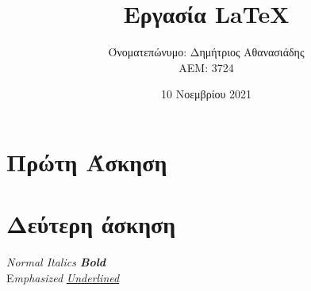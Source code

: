 \documentclass{article}
\title{Εργασία \textlatin {\LaTeX}} %
\author{Όνοματεπώνυμο: Δημήτριος Αθανασιάδης  \\  ΑΕΜ: 3724}       %
\date{10 Νοεμβρίου 2021}
\begin{document}
\maketitle

\section{Πρώτη Άσκηση}
\begin{center}
\end{center}

\section{Δεύτερη άσκηση}
\begin{center}
\textlatin{\textit{Normal Italics \textbf{Bold}}\\ E\emph{mphasized}  \textit{\underline{Underlined}}}
\end{center}
\end{document}
